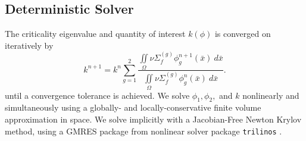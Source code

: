\documentclass[11pt]{article}
\newcommand{\xs}[2]{\ensuremath{\Sigma_{#1}^{(#2)}}}
\begin{document}
\subsection{Deterministic Solver}
The criticality eigenvalue and quantity of interest $k(\phi)$ is converged on iteratively by
\begin{equation}
k^{n+1}=k^n\sum_{g=1}^2\frac{\iint\limits_\Omega\nu\xs{f}{g}\phi_g^{n+1}(\bar x)~d\bar x}{\iint\limits_\Omega\nu\xs{f}{g}\phi_g^{n}(\bar x)~d\bar x}.
\end{equation}
until a convergence tolerance is achieved.  We solve $\phi_1,\phi_2,$ and $k$ nonlinearly and simultaneously using a globally- and locally-conservative finite volume approximation in space.  We solve implicitly with a Jacobian-Free Newton Krylov method, using a GMRES package from nonlinear solver package \texttt{trilinos} \cite{Trilinos-Overview}.\\
\end{document}
